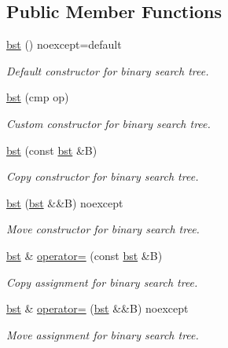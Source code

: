 \subsection*{Public Member Functions}
\begin{DoxyCompactItemize}
\item 
\mbox{\label{classbst_aad9ff859f9b3d8896e4cd9bf14143777}} 
\hyperlink{classbst_aad9ff859f9b3d8896e4cd9bf14143777}{bst} () noexcept=default
\begin{DoxyCompactList}\small\item\em Default constructor for binary search tree. \end{DoxyCompactList}\item 
\hyperlink{classbst_a8d0c20c3ace61d4ffde5ab90fbe3226b}{bst} (cmp op)
\begin{DoxyCompactList}\small\item\em Custom constructor for binary search tree. \end{DoxyCompactList}\item 
\hyperlink{classbst_a2f94afc86338e90d9110b713383ab492}{bst} (const \hyperlink{classbst}{bst} \&B)
\begin{DoxyCompactList}\small\item\em Copy constructor for binary search tree. \end{DoxyCompactList}\item 
\hyperlink{classbst_ac0e8f8be6be76d77809ba1d21e1be66a}{bst} (\hyperlink{classbst}{bst} \&\&B) noexcept
\begin{DoxyCompactList}\small\item\em Move constructor for binary search tree. \end{DoxyCompactList}\item 
\hyperlink{classbst}{bst} \& \hyperlink{classbst_a962fce8c5811b3bab57d298b6752481f}{operator=} (const \hyperlink{classbst}{bst} \&B)
\begin{DoxyCompactList}\small\item\em Copy assignment for binary search tree. \end{DoxyCompactList}\item 
\hyperlink{classbst}{bst} \& \hyperlink{classbst_a3e595b50a147f3c6fe64f1b1514c539d}{operator=} (\hyperlink{classbst}{bst} \&\&B) noexcept
\begin{DoxyCompactList}\small\item\em Move assignment for binary search tree. \end{DoxyCompactList}\item 

\end{DoxyCompactItemize}
